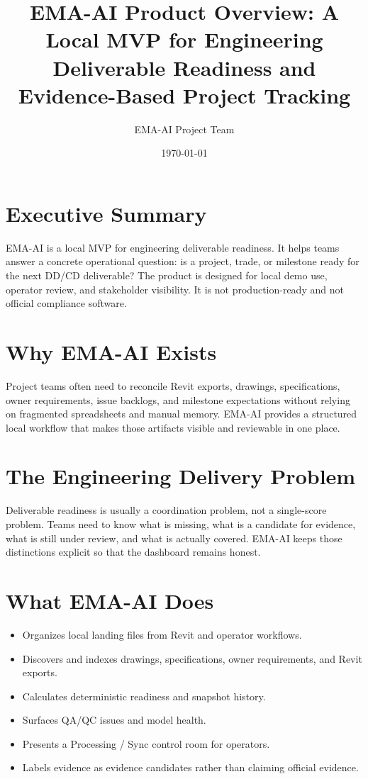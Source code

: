 \documentclass[11pt]{article}
\title{EMA-AI Product Overview: A Local MVP for Engineering Deliverable Readiness and Evidence-Based Project Tracking}
\author{EMA-AI Project Team}
\date{\today}
\begin{document}
\maketitle
\tableofcontents
\newpage

\section{Executive Summary}
EMA-AI is a local MVP for engineering deliverable readiness. It helps teams answer a concrete operational question: is a project, trade, or milestone ready for the next DD/CD deliverable? The product is designed for local demo use, operator review, and stakeholder visibility. It is not production-ready and not official compliance software.

\section{Why EMA-AI Exists}
Project teams often need to reconcile Revit exports, drawings, specifications, owner requirements, issue backlogs, and milestone expectations without relying on fragmented spreadsheets and manual memory. EMA-AI provides a structured local workflow that makes those artifacts visible and reviewable in one place.

\section{The Engineering Delivery Problem}
Deliverable readiness is usually a coordination problem, not a single-score problem. Teams need to know what is missing, what is a candidate for evidence, what is still under review, and what is actually covered. EMA-AI keeps those distinctions explicit so that the dashboard remains honest.

\section{What EMA-AI Does}
\begin{itemize}[leftmargin=*]
\item Organizes local landing files from Revit and operator workflows.
\item Discovers and indexes drawings, specifications, owner requirements, and Revit exports.
\item Calculates deterministic readiness and snapshot history.
\item Surfaces QA/QC issues and model health.
\item Presents a Processing / Sync control room for operators.
\item Labels evidence as evidence candidates rather than claiming official evidence.
\end{itemize}
\end{document}

